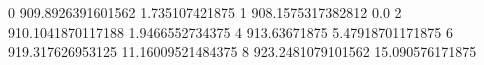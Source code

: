 0 909.8926391601562 1.735107421875
1 908.1575317382812 0.0
2 910.1041870117188 1.9466552734375
4 913.63671875 5.47918701171875
6 919.317626953125 11.16009521484375
8 923.2481079101562 15.090576171875

